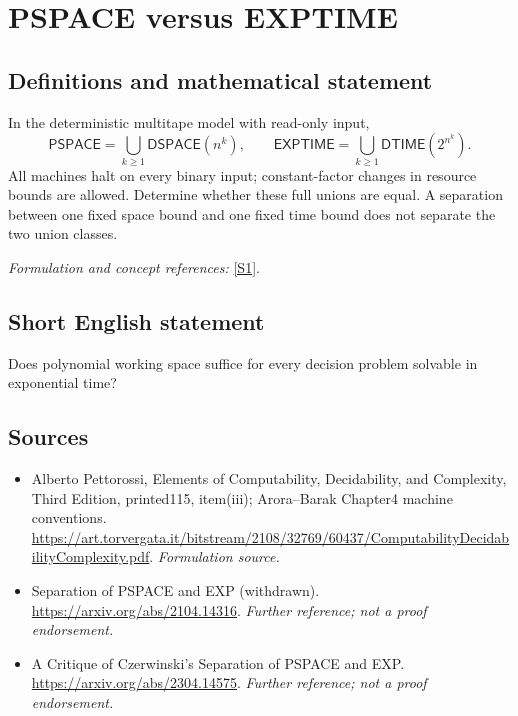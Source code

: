 \documentclass[11pt]{article}
\begin{document}
\section*{\texorpdfstring{PSPACE versus EXPTIME}{PSPACE versus EXPTIME}}\label{30006721}
\subsection{Definitions and mathematical statement}
In the deterministic multitape model with read-only input,
\[
 \mathsf{PSPACE}=\bigcup_{k\ge1}\mathsf{DSPACE}(n^k),\qquad
 \mathsf{EXPTIME}=\bigcup_{k\ge1}\mathsf{DTIME}(2^{n^k}).
\]
All machines halt on every binary input; constant-factor changes in resource bounds are allowed. Determine whether these full unions are equal. A separation between one fixed space bound and one fixed time bound does not separate the two union classes.
\par\smallskip\textit{Formulation and concept references:} \href{https://art.torvergata.it/bitstream/2108/32769/60437/ComputabilityDecidabilityComplexity.pdf}{[S1]}.

\subsection{Short English statement}
Does polynomial working space suffice for every decision problem solvable in exponential time?
\subsection{Sources}
\begin{itemize}
\item[S1]Alberto Pettorossi, Elements of Computability, Decidability, and Complexity, Third Edition, printed115, item(iii); Arora–Barak Chapter4 machine conventions.
\url{https://art.torvergata.it/bitstream/2108/32769/60437/ComputabilityDecidabilityComplexity.pdf}.
\textit{Formulation source.}
\item[S2]Separation of PSPACE and EXP (withdrawn).
\url{https://arxiv.org/abs/2104.14316}.
\textit{Further reference; not a proof endorsement.}
\item[S3]A Critique of Czerwinski's Separation of PSPACE and EXP.
\url{https://arxiv.org/abs/2304.14575}.
\textit{Further reference; not a proof endorsement.}
\end{itemize}
\end{document}
